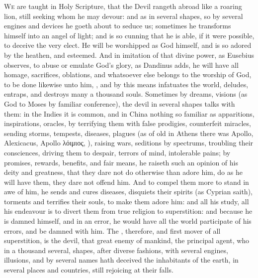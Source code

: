 {\lettrine{W}{e} are taught in Holy Scripture, that the Devil rangeth abroad like a
roaring lion, still seeking whom he may devour: and as in several
shapes, so by several engines and devices he goeth about to seduce us;
sometimes he transforms himself into an angel of light; and is so
cunning that he is able, if it were possible, to deceive the very
elect. He will be worshipped as God himself, and is so adored by
the heathen, and esteemed. And in imitation of that divine power, as
Eusebius observes, to abuse or emulate God's glory, as
Dandinus adds, he will have all homage, sacrifices, oblations, and
whatsoever else belongs to the worship of God, to be done likewise unto
him, , and by this means infatuates the world,
deludes, entraps, and destroys many a thousand souls. Sometimes by
dreams, visions (as God to Moses by familiar conference), the devil in
several shapes talks with them: in the Indies it is common, and
in China nothing so familiar as apparitions, inspirations, oracles, by
terrifying them with false prodigies, counterfeit miracles, sending
storms, tempests, diseases, plagues (as of old in Athens there was
Apollo, Alexicacus, Apollo \textgreek{λόιμιος}, ),
raising wars, seditions by spectrums, troubling their consciences,
driving them to despair, terrors of mind, intolerable pains; by
promises, rewards, benefits, and fair means, he raiseth such an opinion
of his deity and greatness, that they dare not do otherwise than adore
him, do as he will have them, they dare not offend him. And to compel
them more to stand in awe of him, he sends and cures diseases,
disquiets their spirits (as Cyprian saith), torments and terrifies
their souls, to make them adore him: and all his study, all his
endeavour is to divert them from true religion to superstition: and
because he is damned himself, and in an error, he would have all the
world participate of his errors, and be damned with him. The , therefore, and first mover of all superstition, is the devil,
that great enemy of mankind, the principal agent, who in a thousand
several, shapes, after diverse fashions, with several engines,
illusions, and by several names hath deceived the inhabitants of the
earth, in several places and countries, still rejoicing at their falls.

}
